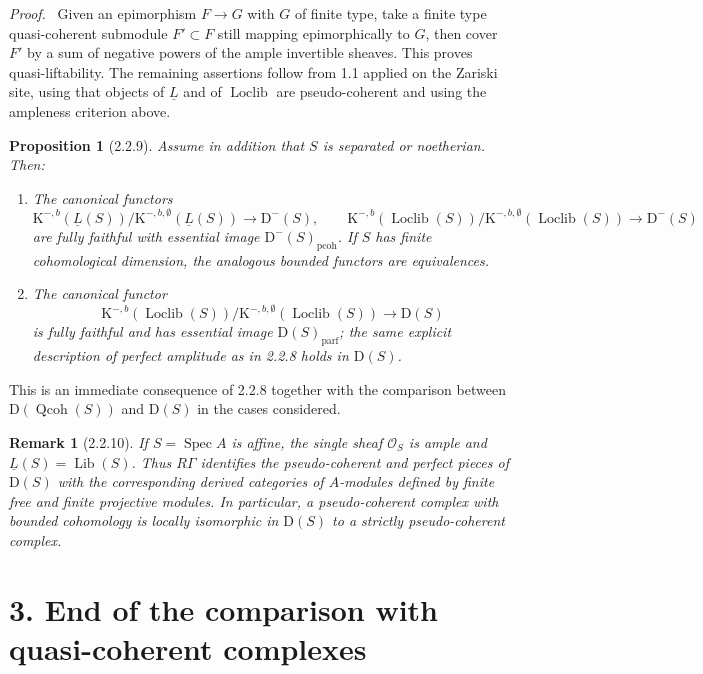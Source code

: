 \documentclass[13pt]{extarticle}
\newcommand{\cO}{\mathcal O}
\newcommand{\D}{\mathrm D}
\newcommand{\K}{\mathrm K}
\newcommand{\Qcoh}{\operatorname{Qcoh}}
\newcommand{\Loclib}{\operatorname{Loclib}}
\newcommand{\Lib}{\operatorname{Lib}}
\newcommand{\Spec}{\operatorname{Spec}}
\newenvironment{prooftext}[1][Proof]{\par\noindent\emph{#1.}\ }{\par\medskip}
\newtheorem*{proposition*}{Proposition}
\newtheorem*{remark*}{Remark}
\begin{document}
\begin{prooftext}
Given an epimorphism $F\to G$ with $G$ of finite type, take a finite type quasi-coherent submodule $F'\subset F$ still mapping epimorphically to $G$, then cover $F'$ by a sum of negative powers of the ample invertible sheaves. This proves quasi-liftability. The remaining assertions follow from 1.1 applied on the Zariski site, using that objects of $\underline L$ and of $\Loclib$ are pseudo-coherent and using the ampleness criterion above.
\end{prooftext}

\begin{proposition*}[2.2.9]
Assume in addition that $S$ is separated or noetherian. Then:
\begin{enumerate}[label=\alph*)]
\item The canonical functors
\[
\K^{-,b}(\underline L(S))/\K^{-,b,\emptyset}(\underline L(S))\to\D^-(S),
\qquad
\K^{-,b}(\Loclib(S))/\K^{-,b,\emptyset}(\Loclib(S))\to\D^-(S)
\]
are fully faithful with essential image $\D^-(S)_{\mathrm{pcoh}}$. If $S$ has finite cohomological dimension, the analogous bounded functors are equivalences.
\item The canonical functor
\[
\K^{-,b}(\Loclib(S))/\K^{-,b,\emptyset}(\Loclib(S))\to\D(S)
\]
is fully faithful and has essential image $\D(S)_{\mathrm{parf}}$; the same explicit description of perfect amplitude as in 2.2.8 holds in $\D(S)$.
\end{enumerate}
\end{proposition*}

This is an immediate consequence of 2.2.8 together with the comparison between $\D(\Qcoh(S))$ and $\D(S)$ in the cases considered.

\begin{remark*}[2.2.10]
If $S=\Spec A$ is affine, the single sheaf $\cO_S$ is ample and $\underline L(S)=\Lib(S)$. Thus $R\Gamma$ identifies the pseudo-coherent and perfect pieces of $\D(S)$ with the corresponding derived categories of $A$-modules defined by finite free and finite projective modules. In particular, a pseudo-coherent complex with bounded cohomology is locally isomorphic in $\D(S)$ to a strictly pseudo-coherent complex.
\end{remark*}

\section*{3. End of the comparison with quasi-coherent complexes}
\end{document}
